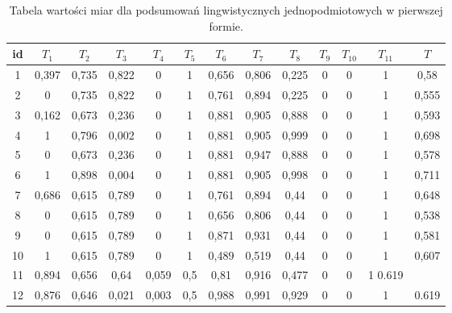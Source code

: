 \documentclass{classrep}
\begin{document}
\begin{center}
  \begin{table}[H]
    \begin{adjustbox}{center=14cm}
    \begin{tabularx}{\textwidth}{ccccccccccccc}
    
    id & $T_1$ & $T_2$ & $T_3$ & $T_4$ & $T_5$ & $T_6$ & $T_7$ & $T_8$ & $T_9$ & $T_{10}$ & $T_{11}$ & $T$ \\ \hline 

    1 & 0,397  & 0,735  & 0,822  & 0  & 1  & 0,656  & 0,806  & 0,225  & 0  & 0  & 1  & 0,58\\ \hline
    2 & 0  & 0,735  & 0,822  & 0  & 1  & 0,761  & 0,894  & 0,225  & 0  & 0  & 1  & 0,555\\ \hline
    3 & 0,162  & 0,673  & 0,236  & 0  & 1  & 0,881  & 0,905  & 0,888  & 0  & 0  & 1  & 0,593 \\ \hline
    4 & 1  & 0,796  & 0,002  & 0  & 1  & 0,881  & 0,905  & 0,999  & 0  & 0  & 1  & 0,698  \\ \hline
    5 & 0  & 0,673  & 0,236  & 0  & 1  & 0,881  & 0,947  & 0,888  & 0  & 0  & 1  & 0,578  \\ \hline  
    6 & 1  & 0,898  & 0,004  & 0  & 1  & 0,881  & 0,905  & 0,998  & 0  & 0  & 1  & 0,711  \\ \hline  
    7 & 0,686  & 0,615  & 0,789  & 0  & 1  & 0,761  & 0,894  & 0,44  & 0  & 0  & 1  & 0,648 \\ \hline 
    8 & 0  & 0,615  & 0,789  & 0  & 1  & 0,656  & 0,806  & 0,44  & 0  & 0  & 1  & 0,538 \\ \hline
    9 & 0  & 0,615  & 0,789  & 0  & 1  & 0,871  & 0,931  & 0,44  & 0  & 0  & 1  & 0,581 \\ \hline 
    10 & 1  & 0,615  & 0,789  & 0  & 1  & 0,489  & 0,519  & 0,44  & 0  & 0  & 1  & 0,607 \\ \hline 
    11 & 0,894 & 0,656 & 0,64 & 0,059 & 0,5 & 0,81 & 0,916 & 0,477 & 0 & 0 & 1 0.619 \\ \hline
    12 & 0,876 & 0,646 & 0,021 & 0,003 & 0,5 & 0,988 & 0,991 & 0,929 & 0 & 0 & 1 & 0.619 \\ \hline

  \end{tabularx}
\end{adjustbox}
  \caption{Tabela wartości miar dla podsumowań lingwistycznych jednopodmiotowych w pierwszej formie.}
\end{table}
\end{center}
\end{document}
